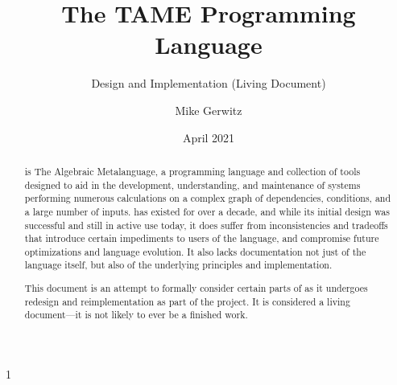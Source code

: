 \documentclass[draft,toc=index,letterpaper]{scrartcl}
\title{The TAME Programming Language}
\subtitle{Design and Implementation (Living Document)}
\author{Mike Gerwitz}
\date{April 2021}%
\begin{document}
\maketitle

\begin{abstract}
  \tame{} is The Algebraic Metalanguage, a programming language and
  collection of tools designed to aid in the development, understanding,
  and maintenance of systems performing numerous calculations on a
  complex graph of dependencies, conditions, and a large number of
  inputs.  \tame{} has existed for over a decade, and while its initial
  design was successful and still in active use today, it does suffer
  from inconsistencies and tradeoffs that introduce certain impediments
  to users of the language, and compromise future optimizations and
  language evolution.  It also lacks documentation not just of the
  language itself, but also of the underlying principles and
  implementation.

  This document is an attempt to formally consider certain parts of
  \tame{} as it undergoes redesign and reimplementation as part of the
  \tamer{} project.  It is considered a living document---it is not
  likely to ever be a finished work.
\end{abstract}


\tableofcontents




\let\WITHAPPENDIX1

\ifx\WITHAPPENDIX1
\clearpage
\appendix

\fi

\cfoot[\thepage]{\thepage}
\clearpage
\printindex
\end{document}
